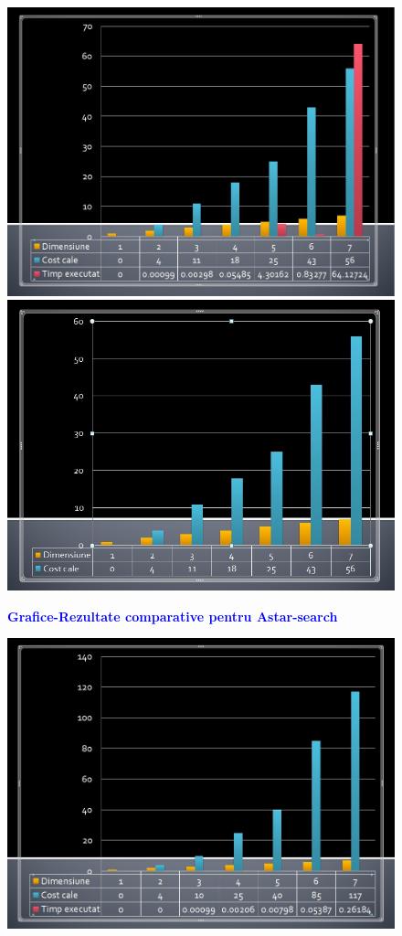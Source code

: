 \documentclass{article}
\begin{document}
\begin{flushleft}
\begin{flushleft}
\begin{figure}
        \centering
        \includegraphics[width=12cm]{grafic-rezultate-obtinute.jpg}\\[0.8cm]
        \includegraphics[width=12cm]{grafic-rezultate2.jpg}
        \bfseries \caption{\textbf{\textcolor{blue}{Grafice-Rezultate comparative pentru Astar-search}}}
\end{figure}
\begin{figure}
        \centering
        \includegraphics[width=12cm]{grafic-rezultate-bfs.jpg}\\[0.8cm]

\end{figure}
\end{flushleft}
\end{flushleft}
\end{document}
